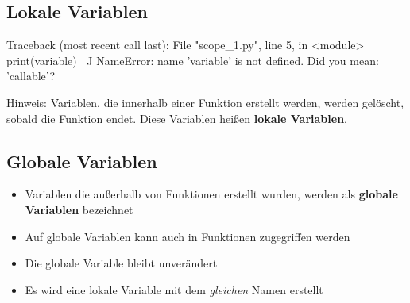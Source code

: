 \subsection{Lokale Variablen}
\begin{frame}[fragile]
    \slidehead
    \vspace{-1em}%
    \pause%
    \vspace{-.8em}%
    \pause%
    \begin{commandshell}[fontsize=\footnotesize][minted language=text,top=0cm,bottom=0cm]
        Traceback (most recent call last):
        File "scope_1.py", line 5, in <module>
            print(variable)
                ^^^^^^^^
        NameError: name 'variable' is not defined. Did you mean: 'callable'?
    \end{commandshell}%
    \vspace{-.7em}%
    \pause%
    \begin{block}{Hinweis:}%
        Variablen, die innerhalb einer Funktion erstellt werden, werden gelöscht, sobald die Funktion endet.
        Diese Variablen heißen \textbf{lokale Variablen}.
    \end{block}
\end{frame}

\subsection{Globale Variablen}
\begin{frame}
    \slidehead
    \begin{itemize}
        \item Variablen die außerhalb von Funktionen erstellt wurden, werden als \textbf{globale Variablen} bezeichnet
        \item Auf globale Variablen kann auch in Funktionen zugegriffen werden
    \end{itemize}
\end{frame}

\begin{frame}
    \slidehead
    \begin{itemize}
        \item Die globale Variable  bleibt unverändert
        \item Es wird eine lokale Variable mit dem \textit{gleichen} Namen erstellt
    \end{itemize}
\end{frame}

